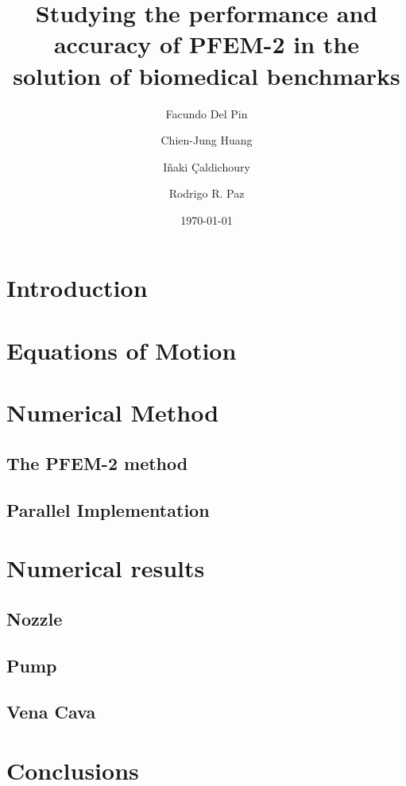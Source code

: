 \documentclass[twocolumn]{svjour3}          %
\begin{document}
\title{Studying the performance and accuracy of PFEM-2 in the solution of biomedical benchmarks}
\author{Facundo Del Pin\and Chien-Jung Huang\and I\~naki \c{C}aldichoury\and Rodrigo R. Paz}
\date{\today}

\maketitle

\begin{abstract}

\end{abstract}


\section{Introduction}


\section{Equations of Motion}


\section{Numerical Method}
  
 \subsection{The PFEM-2 method}
  
 \subsection{Parallel Implementation}
  

\section{Numerical results}
\subsection{Nozzle}
\subsection{Pump}
\subsection{Vena Cava}


\section{Conclusions}

\begin{thebibliography}{9}
  
\end{thebibliography}
\end{document}
